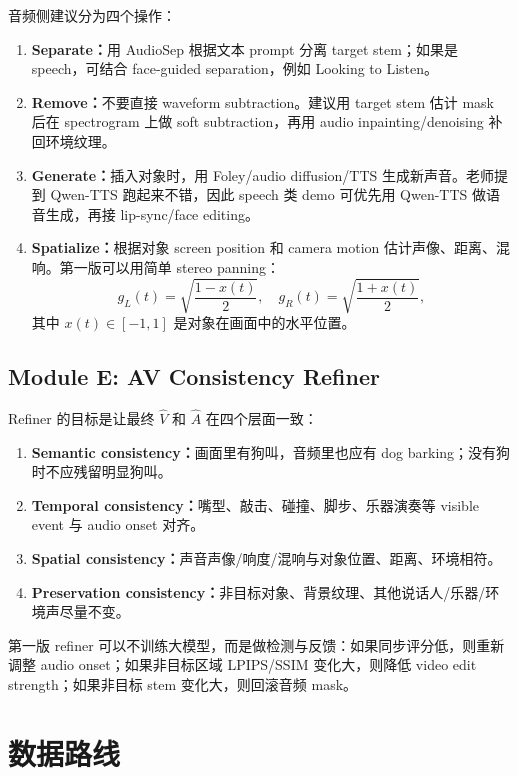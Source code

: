 音频侧建议分为四个操作：

\begin{enumerate}[leftmargin=2em]
  \item \textbf{Separate：}用 AudioSep 根据文本 prompt 分离 target stem；如果是 speech，可结合 face-guided separation，例如 Looking to Listen。
  \item \textbf{Remove：}不要直接 waveform subtraction。建议用 target stem 估计 mask 后在 spectrogram 上做 soft subtraction，再用 audio inpainting/denoising 补回环境纹理。
  \item \textbf{Generate：}插入对象时，用 Foley/audio diffusion/TTS 生成新声音。老师提到 Qwen-TTS 跑起来不错，因此 speech 类 demo 可优先用 Qwen-TTS 做语音生成，再接 lip-sync/face editing。
  \item \textbf{Spatialize：}根据对象 screen position 和 camera motion 估计声像、距离、混响。第一版可以用简单 stereo panning：
  \[
  g_L(t)=\sqrt{\frac{1-x(t)}{2}},\quad g_R(t)=\sqrt{\frac{1+x(t)}{2}},
  \]
  其中 $x(t)\in[-1,1]$ 是对象在画面中的水平位置。
\end{enumerate}

\subsection{Module E: AV Consistency Refiner}

Refiner 的目标是让最终 $\hat V$ 和 $\hat A$ 在四个层面一致：

\begin{enumerate}[leftmargin=2em]
  \item \textbf{Semantic consistency：}画面里有狗叫，音频里也应有 dog barking；没有狗时不应残留明显狗叫。
  \item \textbf{Temporal consistency：}嘴型、敲击、碰撞、脚步、乐器演奏等 visible event 与 audio onset 对齐。
  \item \textbf{Spatial consistency：}声音声像/响度/混响与对象位置、距离、环境相符。
  \item \textbf{Preservation consistency：}非目标对象、背景纹理、其他说话人/乐器/环境声尽量不变。
\end{enumerate}

第一版 refiner 可以不训练大模型，而是做检测与反馈：如果同步评分低，则重新调整 audio onset；如果非目标区域 LPIPS/SSIM 变化大，则降低 video edit strength；如果非目标 stem 变化大，则回滚音频 mask。

\section{数据路线}

